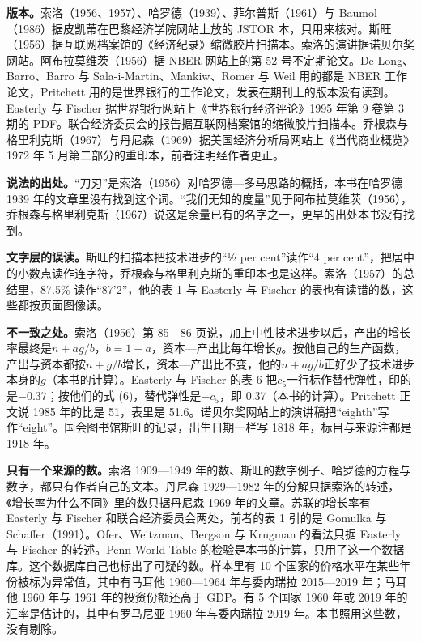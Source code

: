 \begin{deeper}[史料说明]
\textbf{版本。}索洛（1956、1957）、哈罗德（1939）、菲尔普斯（1961）与 Baumol（1986）据皮凯蒂在巴黎经济学院网站上放的 JSTOR 本，只用来核对。斯旺（1956）据互联网档案馆的《经济纪录》缩微胶片扫描本。索洛的演讲据诺贝尔奖网站。阿布拉莫维茨（1956）据 NBER 网站上的第 52 号不定期论文。De Long、Barro、Barro 与 Sala-i-Martin、Mankiw、Romer 与 Weil 用的都是 NBER 工作论文，Pritchett 用的是世界银行的工作论文，发表在期刊上的版本没有读到。Easterly 与 Fischer 据世界银行网站上《世界银行经济评论》1995 年第 9 卷第 3 期的 PDF。联合经济委员会的报告据互联网档案馆的缩微胶片扫描本。乔根森与格里利克斯（1967）与丹尼森（1969）据美国经济分析局网站上《当代商业概览》1972 年 5 月第二部分的重印本，前者注明经作者更正。

\textbf{说法的出处。}“刀刃”是索洛（1956）对哈罗德—多马思路的概括，本书在哈罗德 1939 年的文章里没有找到这个词。“我们无知的度量”见于阿布拉莫维茨（1956），乔根森与格里利克斯（1967）说这是余量已有的名字之一，更早的出处本书没有找到。

\textbf{文字层的误读。}斯旺的扫描本把技术进步的“½ per cent”读作“4 per cent”，把居中的小数点读作连字符，乔根森与格里利克斯的重印本也是这样。索洛（1957）的总结里，87.5\% 读作“87'2”，他的表 1 与 Easterly 与 Fischer 的表也有读错的数，这些都按页面图像读。

\textbf{不一致之处。}索洛（1956）第 85—86 页说，加上中性技术进步以后，产出的增长率最终是$n+ag/b$，$b=1-a$，资本—产出比每年增长$g$。按他自己的生产函数，产出与资本都按$n+g/b$增长，资本—产出比不变，他的$n+ag/b$正好少了技术进步本身的$g$（本书的计算）。Easterly 与 Fischer 的表 6 把$c_5$一行标作替代弹性，印的是$-0.37$；按他们的式 (6)，替代弹性是$-c_5$，即 0.37（本书的计算）。Pritchett 正文说 1985 年的比是 51，表里是 51.6。诺贝尔奖网站上的演讲稿把“eighth”写作“eight”。国会图书馆斯旺的记录，出生日期一栏写 1818 年，标目与来源注都是 1918 年。

\textbf{只有一个来源的数。}索洛 1909—1949 年的数、斯旺的数字例子、哈罗德的方程与数字，都只有作者自己的文本。丹尼森 1929—1982 年的分解只据索洛的转述，《增长率为什么不同》里的数只据丹尼森 1969 年的文章。苏联的增长率有 Easterly 与 Fischer 和联合经济委员会两处，前者的表 1 引的是 Gomulka 与 Schaffer（1991）。Ofer、Weitzman、Bergson 与 Krugman 的看法只据 Easterly 与 Fischer 的转述。Penn World Table 的检验是本书的计算，只用了这一个数据库。这个数据库自己也标出了可疑的数。样本里有 10 个国家的价格水平在某些年份被标为异常值，其中有马耳他 1960—1964 年与委内瑞拉 2015—2019 年；马耳他 1960 年与 1961 年的投资份额还高于 GDP。有 5 个国家 1960 年或 2019 年的汇率是估计的，其中有罗马尼亚 1960 年与委内瑞拉 2019 年。本书照用这些数，没有剔除。


\end{deeper}
